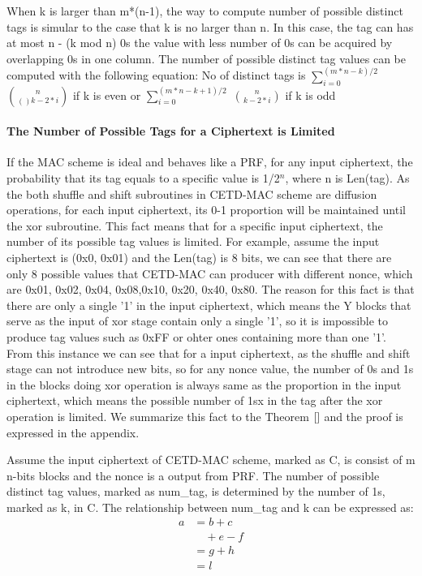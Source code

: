 When k is larger than m*(n-1), the way to compute number of possible distinct tags is simular to the case that k is no larger than n. In this case, the tag can has at most n - (k mod n) 0s the value with less number of 0s can be acquired by overlapping 0s in one column. The number of possible distinct tag values can be computed with the following equation:
No of distinct tags is $\sum_{i=0}^{(m*n-k)/2}$ $\binom{n}{()k-2*i}$ if k is even or $\sum_{i=0}^{(m*n-k+1)/2}$ $\binom{n}{k-2*i}$ if k is odd

\paragraph{The Number of Possible Tags for a Ciphertext is Limited}
If the MAC scheme is ideal and behaves like a PRF, for any input ciphertext, the probability that its tag equals to a specific value is 1/2$^n$, where n is Len(tag). 
As the both shuffle and shift subroutines in CETD-MAC scheme are diffusion operations, for each input ciphertext, its 0-1 proportion will be maintained until the xor subroutine. This fact means that for a specific input ciphertext, the number of its possible tag values is limited. For example, assume the input ciphertext is (0x0, 0x01) and the Len(tag) is 8 bits, we can see that there are only 8 possible values that CETD-MAC can producer with different nonce, which are {0x01, 0x02, 0x04, 0x08,0x10, 0x20, 0x40, 0x80}. The reason for this fact is that there are only a single '1' in the input ciphertext, which means the Y blocks that serve as the input of xor stage contain only a single '1', so it is impossible to produce tag values such as 0xFF or ohter ones containing more than one '1'. From this instance we can see that for a input ciphertext, as the shuffle and shift stage can not introduce new bits, so for any nonce value, the number of 0s and 1s in the blocks doing xor operation is always same as the proportion in the input ciphertext, which means the possible number of 1sx in the tag after the xor operation is limited. We summarize this fact to the Theorem $\ref{}$ and the proof is expressed in the appendix.
\begin{theorem}
Assume the input ciphertext of CETD-MAC scheme, marked as C,  is consist of m n-bits blocks and the nonce is a output from PRF. The number of possible distinct tag values, marked as num\_tag, is determined by the number of 1s, marked as k, in C. The relationship between num\_tag and k can be expressed as:
\begin{equation}\label{xx}
\begin{split}
a& = b+c\\
	 &\quad +e-f\\
	 &= g+h\\
	 &= l
\end{split}
\end{equation}
\end{theorem}
